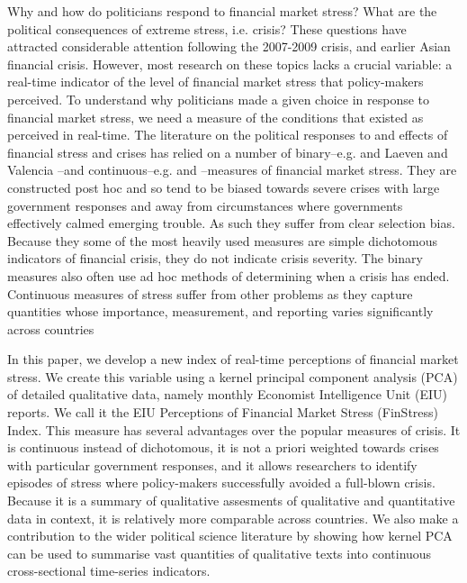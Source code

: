 \documentclass[]{article}
\begin{document}
Why and how do politicians respond to financial market stress? What are the political consequences of extreme stress, i.e. crisis? These questions have attracted considerable attention following the 2007-2009 crisis, and earlier Asian financial crisis. However, most research on these topics lacks a crucial variable: a real-time indicator of the level of financial market stress that policy-makers perceived. To understand why politicians made a given choice in response to financial market stress, we need a measure of the conditions that existed as perceived in real-time. The literature on the political responses to and effects of financial stress and crises has relied on a number of binary--e.g. \cite{Reinhart2009,ReinhartRog2010} and Laeven and Valencia \citeyearpar[and their predecessors]{laeven2013}--and continuous--e.g. \cite{Lepetit2013} and \cite{Andrianova2015}--measures of financial market stress. They are constructed post hoc and so tend to be biased towards severe crises with large government responses and away from circumstances where governments effectively calmed emerging trouble. As such they suffer from clear selection bias. Because they some of the most heavily used measures are simple dichotomous indicators of financial crisis, they do not indicate crisis severity. The binary measures also often use ad hoc methods of determining when a crisis has ended. Continuous measures of stress suffer from other problems as they capture quantities whose importance, measurement, and reporting varies significantly across countries

In this paper, we develop a new index of real-time perceptions of financial market stress. We create this variable using a kernel principal component analysis (PCA) of detailed qualitative data, namely monthly Economist Intelligence Unit (EIU) reports. We call it the EIU Perceptions of Financial Market Stress (FinStress) Index. This measure has several advantages over the popular measures of crisis. It is continuous instead of dichotomous, it is not a priori weighted towards crises with particular government responses, and it allows researchers to identify episodes of stress where policy-makers successfully avoided a full-blown crisis. Because it is a summary of qualitative assesments of qualitative and quantitative data in context, it is relatively more comparable across countries. We also make a contribution to the wider political science literature by showing how kernel PCA can be used to summarise vast quantities of qualitative texts into continuous cross-sectional time-series indicators.
\end{document}
